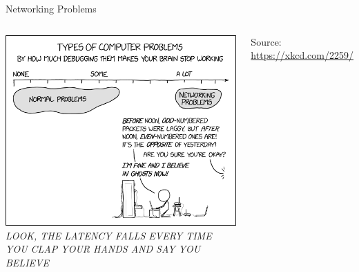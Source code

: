 \newcommand{\rx}[1]{\texttt{"{\color{olive}#1}"}}
\newcommand{\match}[1]{{\color{blue}#1}}
\newcommand{\qtt}[1]{\texttt{"{#1}"}}


\begin{frame}[t,plain]
\titlepage
\end{frame}


\begin{frame}[fragile]{Networking Problems}
%
\begin{center}
\begin{columns}
\includegraphics[width=\linewidth]{./gfx/20-xkcd-networking_problems}
%
\emph{LOOK, THE LATENCY FALLS EVERY TIME YOU CLAP YOUR HANDS AND SAY YOU BELIEVE}

\vspace{6pt}
Source: \url{https://xkcd.com/2259/}

\end{columns}
\end{center}
%
\end{frame}


